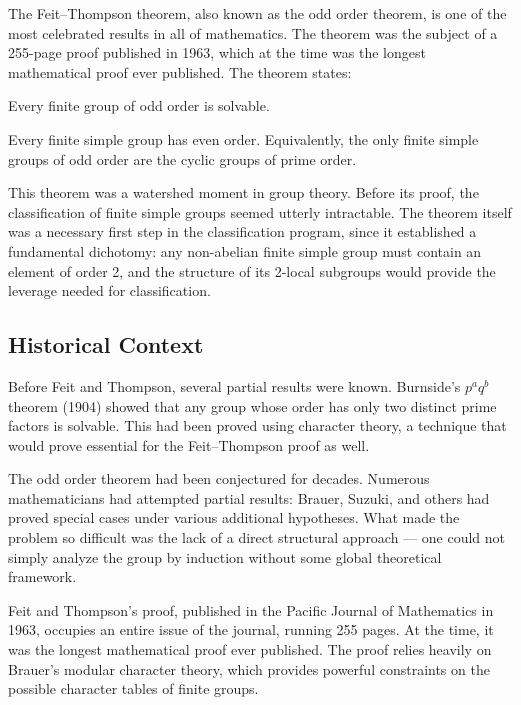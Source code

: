 The Feit--Thompson theorem, also known as the odd order theorem, is one of the most celebrated results in all of mathematics. The theorem was the subject of a 255-page proof published in 1963, which at the time was the longest mathematical proof ever published. The theorem states:

\begin{theorem}
Every finite group of odd order is solvable.
\end{theorem}

\begin{corollary}
Every finite simple group has even order. Equivalently, the only finite simple groups of odd order are the cyclic groups of prime order.
\end{corollary}

This theorem was a watershed moment in group theory. Before its proof, the classification of finite simple groups seemed utterly intractable. The theorem itself was a necessary first step in the classification program, since it established a fundamental dichotomy: any non-abelian finite simple group must contain an element of order 2, and the structure of its 2-local subgroups would provide the leverage needed for classification.

\subsection{Historical Context}

Before Feit and Thompson, several partial results were known. Burnside's \(p^a q^b\) theorem (1904) showed that any group whose order has only two distinct prime factors is solvable. This had been proved using character theory, a technique that would prove essential for the Feit--Thompson proof as well.

The odd order theorem had been conjectured for decades. Numerous mathematicians had attempted partial results: Brauer, Suzuki, and others had proved special cases under various additional hypotheses. What made the problem so difficult was the lack of a direct structural approach --- one could not simply analyze the group by induction without some global theoretical framework.

Feit and Thompson's proof, published in the Pacific Journal of Mathematics in 1963, occupies an entire issue of the journal, running 255 pages. At the time, it was the longest mathematical proof ever published. The proof relies heavily on Brauer's modular character theory, which provides powerful constraints on the possible character tables of finite groups.

